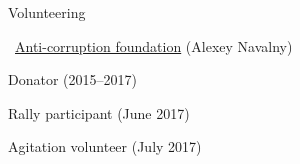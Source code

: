 \documentclass{resume} %
\begin{document}
\begin{rSection}{Volunteering}
	\begin{rSubsection}{\faExternalLink~\href{https://fbk.info/english/about/}{Anti-corruption foundation} (Alexey Navalny)}{}{}{}
		\item Donator (2015--2017)
		\item Rally participant (June 2017)
		\item Agitation volunteer (July 2017)
	\end{rSubsection}
\end{rSection}

\end{document}
